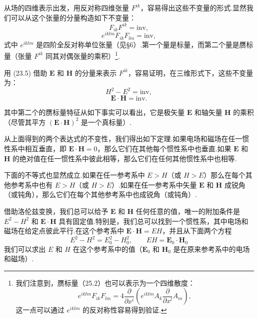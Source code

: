 从场的四维表示出发，用反对称四维张量 $F^{ik}$，容易得出这些不变量的形式.显然我们可以从这个张量的分量构造如下不变量：
\begin{equation}
  F_{ik}F^{ik}=\mathrm{inv},
\end{equation}
\begin{equation}
  e^{iklm}F_{ik}F_{lm}=\mathrm{inv},
\end{equation}
式中 $e^{iklm}$ 是四阶全反对称单位张量（见§6）.第一个量是标量，而第二个量是赝标量（张量 $F^{ik}$
同其对偶张量的乘积）\footnote{我们注意到，赝标量（25.2）也可以表示为一个四维散度：
\begin{equation*}
  e^{iklm}F_{ik}F_{lm}=4\frac{\partial}{\partial x^i}
  \left(e^{iklm}A_k\frac{\partial}{\partial x^l}A_m\right),
\end{equation*}
这一点可以通过 $e^{iklm}$ 的反对称性容易得到验证.}.

用 (23.5) 借助 $\boldsymbol{E}$ 和 $\boldsymbol{H}$ 的分量来表示 $F^{ik}$，容易证明，在三维形式下，这些不变量为：
\begin{equation}
  H^2-E^2=\mathrm{inv},
\end{equation}
\begin{equation}
  \boldsymbol{E}\cdot\boldsymbol{H}=\mathrm{inv}.
\end{equation}

其中第二个的赝标量特征从如下事实可以看出，它是极矢量 $\boldsymbol{E}$ 和轴矢量 $\boldsymbol{H}$
的乘积（尽管其平方 $(\boldsymbol{E}\cdot\boldsymbol{H})^2$ 是一个真标量）.

从上面得到的两个表达式的不变性，我们得出如下定理.如果电场和磁场在任一惯性系中相互垂直，即
$\boldsymbol{E}\cdot\boldsymbol{H}=0$，那么它们在其他每个惯性系中也垂直.如果 $\boldsymbol{E}$ 和
$\boldsymbol{H}$ 的绝对值在任一惯性系中彼此相等，那么它们在任何其他惯性系中也相等.

下面的不等式也显然成立.如果在任一参考系中 $E>H$（或 $H>E$）那么在每个其他参考系中也有 $E>H$（或
$H>E$）.如果在任一参考系中矢量 $\boldsymbol{E}$ 和 $\boldsymbol{H}$
成锐角（或钝角），那么它们在每个其他参考系中也成锐角（或钝角）.

借助洛伦兹变换，我们总可以给予 $\boldsymbol{E}$ 和 $\boldsymbol{H}$
任何任意的值，唯一的附加条件是 $E^2-H^2$ 和 $\boldsymbol{E}\cdot\boldsymbol{H}$
具有固定值.特别是，我们总可以找到一个惯性系，其中电场和磁场在给定点彼此平行.在这个参考系中
$\boldsymbol{E}\cdot\boldsymbol{H}=EH$，并且从下面两个方程
\begin{equation*}
  E^2-H^2=E_0^2-H_0^2,\qquad EH=\boldsymbol{E}_0\cdot\boldsymbol{H}_0
\end{equation*}
我们可以求出 $E$ 和 $H$ 在这个参考系中的值（$\boldsymbol{E}_0$ 和 $\boldsymbol{H}_0$
是在原来参考系中的电场和磁场）.

